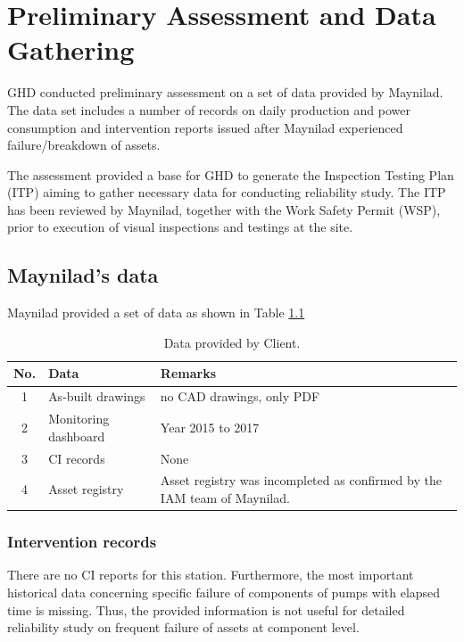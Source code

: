 \chapter{Preliminary Assessment and Data Gathering} %
\label{Chapter2}
GHD conducted preliminary assessment on a set of data provided by Maynilad. The data set includes a number of records on daily production and power consumption and intervention reports issued after Maynilad experienced failure/breakdown of assets.

The assessment provided a base for GHD to generate the Inspection Testing Plan (ITP) \cite{GHD2018j} aiming to gather necessary data for conducting reliability study. The ITP has been reviewed by Maynilad, together with the Work Safety Permit (WSP), prior to execution of visual inspections and testings at the site.

\section{Maynilad's data}
\label{21}
Maynilad provided a set of data as shown in Table \ref{mayniladdata}

\begin{table}[h]
	\caption{Data provided by Client.}
	\label{mayniladdata}
	{\footnotesize
		\begin{tabular}{l|p{5cm}|p{8cm}}
			\hline
			\multicolumn{1}{c|}{No.} & Data & Remarks \\ 
			\hline
			\multicolumn{1}{c|}{1} & As-built drawings & no CAD drawings, only PDF \\ 
			\multicolumn{1}{c|}{2} & Monitoring dashboard & Year 2015 to 2017 \\ 
			\multicolumn{1}{c|}{3} & CI records & None \\ 
			\multicolumn{1}{c|}{4} & Asset registry & Asset registry was incompleted as confirmed by the IAM team of Maynilad. \\ 
			\hline
		\end{tabular}
	}
\end{table}


\subsection{Intervention records}
\label{212}
There are no CI reports for this station. Furthermore, the most important historical data concerning specific failure of components of pumps with elapsed time is missing. Thus, the provided information is not useful for detailed reliability study on frequent failure of assets at component level. 

